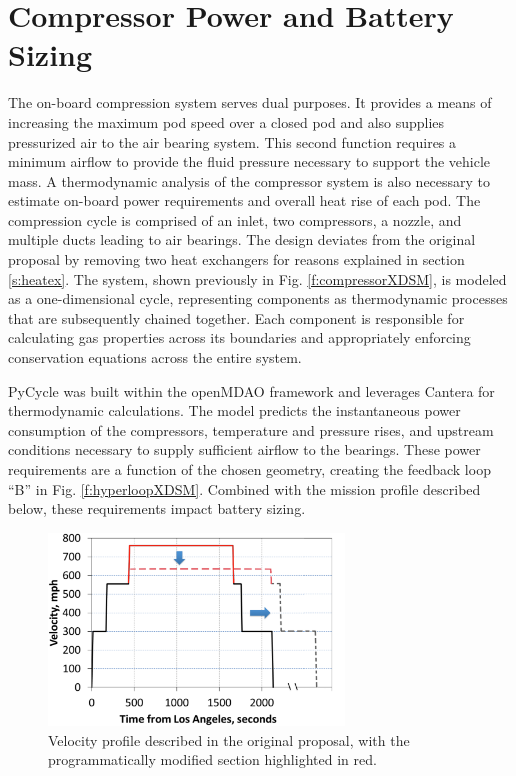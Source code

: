 \documentclass[heading.tex]{subfiles}
\begin{document}
\section{Compressor Power and Battery Sizing}
\label{sec:compressor-and-battery}

The on-board compression system serves dual purposes.
It provides a means of increasing the maximum pod speed over a closed pod and also supplies pressurized air to the air bearing system.
This second function requires a minimum airflow to provide the fluid pressure necessary to support the vehicle mass.
A thermodynamic analysis of the compressor system is also necessary to
estimate on-board power requirements and overall heat rise of each pod.
The compression cycle is comprised of an inlet, two compressors, a nozzle, and multiple ducts leading to air bearings.
The design deviates from the original proposal by removing two heat exchangers for reasons explained in section \ref{s:heatex}.
The system, shown previously in Fig. \ref{f:compressorXDSM}, is modeled as a one-dimensional cycle,
representing components as thermodynamic processes that are subsequently chained together.
Each component is responsible for calculating gas properties across its boundaries
and appropriately enforcing conservation equations across the entire system.

PyCycle was built within the openMDAO framework and leverages Cantera \cite{goodwin2009cantera} for thermodynamic calculations.
The model predicts the instantaneous power consumption of the compressors, temperature and pressure rises,
and upstream conditions necessary to supply sufficient airflow to the bearings.
These power requirements are a function of the chosen geometry, creating the feedback loop “B” in Fig. \ref{f:hyperloopXDSM}.
Combined with the mission profile described below, these requirements impact battery sizing.

\begin{figure}[hbtp]
\centering
\includegraphics[width=0.7\textwidth]{images/velocity_profile3.png}
\caption{Velocity profile described in the original proposal, with the programmatically modified section highlighted in red.}
\label{f:velocity}
\end{figure}
\end{document}
